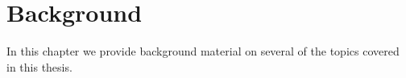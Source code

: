 
\chapter{Background}
\label{ch:background}

In this chapter we provide background material on several of the topics covered in this thesis.